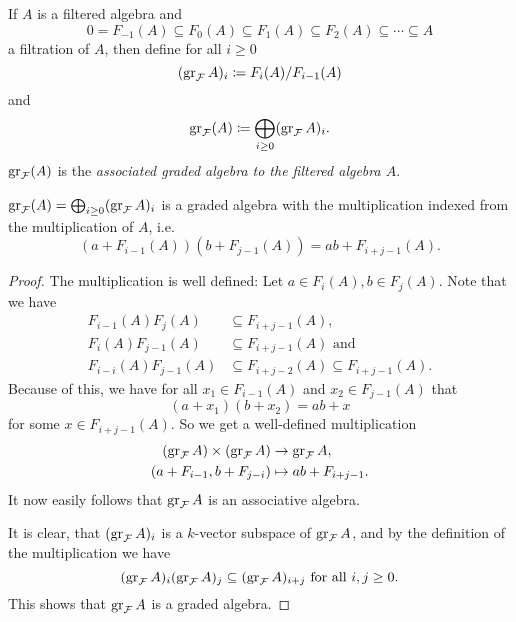 \begin{defi}
 If $A$ is a filtered algebra and
 \[
  0 = F_{-1}(A) \subseteq F_0(A) \subseteq F_1(A) \subseteq F_2(A) \subseteq \dotsb \subseteq A
 \]
 a filtration of $A$, then define for all $i \geq 0$
 \[
  (\operatorname{gr}_\mathcal{F}A)_i \coloneqq F_i(A)/F_{i-1}(A)
 \]
 and
 \[
  \operatorname{gr}_\mathcal{F}(A) \coloneqq \bigoplus_{i \geq 0} (\operatorname{gr}_\mathcal{F}A)_i.
 \]
 $\operatorname{gr}_\mathcal{F}(A)$ is the \emph{associated graded algebra to the filtered algebra $A$}.
\end{defi}



\begin{lem}
 $\operatorname{gr}_\mathcal{F}(A) = \bigoplus_{i \geq 0} (\operatorname{gr}_\mathcal{F}A)_i$ is a graded algebra with the multiplication indexed from the multiplication of $A$, i.e.
 \[
  ( a + F_{i-1}(A) )( b + F_{j-1}(A) ) = ab + F_{i+j-1}(A).
 \]
\end{lem}
\begin{proof}
 The multiplication is well defined: Let $a \in F_i(A), b \in F_j(A)$. Note that we have
 \begin{align*}
  F_{i-1}(A)F_j(A) &\subseteq F_{i+j-1}(A), \\
  F_i(A) F_{j-1}(A) &\subseteq F_{i+j-1}(A) \text{ and } \\
  F_{i-i}(A)F_{j-1}(A) &\subseteq F_{i+j-2}(A) \subseteq F_{i+j-1}(A).
 \end{align*}
 Because of this, we have for all $x_1 \in F_{i-1}(A)$ and $x_2 \in F_{j-1}(A)$ that
 \[
  (a + x_1)(b + x_2) = a b + x
 \]
 for some $x \in F_{i+j-1}(A)$. So we get a well-defined multiplication
 \begin{align*}
  (\operatorname{gr}_\mathcal{F} A) \times (\operatorname{gr}_\mathcal{F} A) &\to \operatorname{gr}_\mathcal{F} A, \\
  (a + F_{i-1}, b + F_{j-i}) &\mapsto ab + F_{i+j-1}.
 \end{align*}
 It now easily follows that $\operatorname{gr}_\mathcal{F} A$ is an associative algebra.
 
 It is clear, that $(\operatorname{gr}_\mathcal{F} A)_i$ is a $k$-vector subspace of $\operatorname{gr}_\mathcal{F} A$, and by the definition of the multiplication we have
 \[
  (\operatorname{gr}_\mathcal{F} A)_i (\operatorname{gr}_\mathcal{F} A)_j \subseteq (\operatorname{gr}_\mathcal{F} A)_{i+j} \text{ for all } i,j \geq 0.
 \]
 This shows that $\operatorname{gr}_\mathcal{F} A$ is a graded algebra.
\end{proof}


